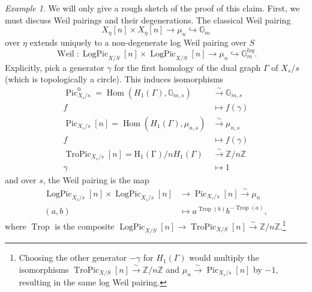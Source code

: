\documentclass[a4paper,11pt]{amsart} %
\numberwithin{equation}{subsection}
\newcommand{\on}[1]{\operatorname{#1}}
\newcommand{\bb}[1]{{\mathbb{#1}}}
\newcommand{\ca}[1]{{\mathcal{#1}}}
\newcommand{\lra}{\longrightarrow}
\newcommand{\hra}{\hookrightarrow}
\newcommand{\iso}{\stackrel{\sim}{\lra}}
\theoremstyle{definition}
\theoremstyle{plain}%
\theoremstyle{remark}
\newtheorem{example}[definition]{Example}
\begin{document}
\begin{example}
We will only give a rough sketch of the proof of this claim. First, we must discuss Weil pairings and their degenerations. The classical Weil pairing
\[
X_\eta[n] \times X_\eta[n] \to \mu_n \hra \bb G_m
\]
over $\eta$ extends uniquely to a non-degenerate log Weil pairing over $S$
\[
\on{Weil} \colon \on{LogPic}_{X/S}[n] \times \on{LogPic}_{X/S}[n] \to \mu_n \hra \bb G_m^{log}.
\]
Explicitly, pick a generator $\gamma$ for the first homology of the dual graph $\Gamma$ of $X_s/s$ (which is topologically a circle). This induces isomorphisms
\begin{align*}
    \on{Pic}^0_{X_s/s} = \on{Hom}(H_1(\Gamma),\bb G_{m,s}) & \iso \bb G_{m,s} \\
    f & \mapsto f(\gamma) \\
    \on{Pic}_{X_s/s}[n] = \on{Hom}(H_1(\Gamma),\mu_{n,s}) & \iso \mu_{n,s} \\
    f & \mapsto f(\gamma) \\
    \on{TroPic}_{X_s/s}[n] = \on{H_1(\Gamma)}/nH_1(\Gamma) & \iso \bb Z/n\bb Z \\
    \gamma & \mapsto 1
\end{align*}
and over $s$, the Weil pairing is the map
\begin{align}\label{formula_weil_pairing}
    \on{LogPic}_{X_s/s}[n] \times \on{LogPic}_{X_s/s}[n] & \to \on{Pic}_{X_s/s}[n] \iso \mu_n \\
    (a,b) & \mapsto a^{\on{Trop}(b)}b^{-\on{Trop}(a)},
\end{align}
where $\on{Trop}$ is the composite $\on{LogPic}_{X/S}[n] \to \on{TroPic}_{X/S}[n] \iso \bb Z/n\bb Z$.\footnote{Choosing the other generator $-\gamma$ for $H_1(\Gamma)$ would multiply the isomorphisms $\on{TroPic}_{X/S}[n] \iso \bb Z/n\bb Z$ and $\mu_n \iso \on{Pic}_{X_s/s}[n]$ by $-1$, resulting in the same log Weil pairing.}


\end{example}
\end{document}
